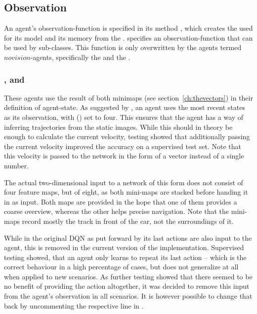 \subsection{Observation}

\label{sec:observation}

An agent's observation-function is specified in its method , which creates the  used for its model and its memory from the .  specifies an observation-function that can be used by sub-classes. This function is only overwritten by the agents termed $novision$-agents, specifically the  and the .

\subsubsection{,  and }

These agents use the result of both minimaps (see section~\ref{ch:thevectors}) in their definition of agent-state. As suggested by \citet{mnih_human-level_2015}, an agent uses the  most recent states as its observation, with  () set to four. This ensures that the agent has a way of inferring trajectories from the static images. While this should in theory be enough to calculate the current velocity, testing showed that additionally passing the current velocity improved the accuracy on a supervised test set. Note that this velocity is passed to the network in the form of a vector instead of a single number.

The actual two-dimensional input to a network of this form does not consist of four feature maps, but of eight, as both mini-maps are stacked before handing it in as input. Both maps are provided in the hope that one of them provides a coarse overview, whereas the other helps precise navigation. Note that the mini-maps record mostly the track in front of the car, not the surroundings of it.

While in the original DQN as put forward by \citet{mnih_human-level_2015} its last actions are also input to the agent, this is removed in the current version of the implementation. Supervised testing showed, that an agent only learns to repeat its last action -- which is the correct behaviour in a high percentage of cases, but does not generalize at all when applied to new scenarios. As further testing showed that there seemed to be no benefit of providing the action altogether, it was decided to remove this input from the agent's observation in all scenarios. It is however possible to change that back by uncommenting the respective line in .

